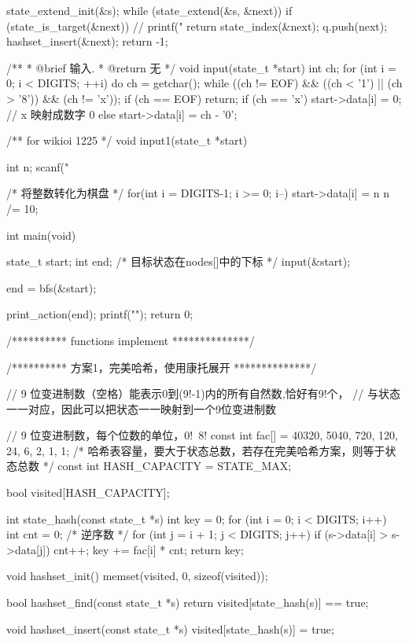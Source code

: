 \begin{Codex}[label=eight_digits_bfs.c]
{{        state_extend_init(&s);
        while (state_extend(&s, &next)) {
            if (state_is_target(&next)) {
                // printf("%
                return state_index(&next);
            }
            q.push(next);
            hashset_insert(&next);
        }
    }
    return -1;
}

/**
 * @brief 输入.
 * @return 无
 */
void input(state_t *start) {
    int ch;
    for (int i = 0; i < DIGITS; ++i) {
        do {
            ch = getchar();
        } while ((ch != EOF) && ((ch < '1') || (ch > '8')) && (ch != 'x'));
        if (ch == EOF) return;
        if (ch == 'x') start->data[i] = 0; // x 映射成数字 0
        else           start->data[i] = ch - '0';
    }
}

/** for wikioi 1225 */
void input1(state_t *start) {
    int n;
    scanf("%

    /* 将整数转化为棋盘 */
    for(int i = DIGITS-1; i >= 0; i--) {
        start->data[i] = n %
        n /= 10;
    }
}

int main(void) {
    state_t start;
    int end; /* 目标状态在nodes[]中的下标 */
    input(&start);

    end = bfs(&start);

    print_action(end);
    printf("\n");
    return 0;
}

/********** functions implement **************/

/********** 方案1，完美哈希，使用康托展开 **************/

// 9 位变进制数（空格）能表示0到(9!-1)内的所有自然数,恰好有9!个，
// 与状态一一对应，因此可以把状态一一映射到一个9位变进制数

// 9 位变进制数，每个位数的单位，0!~8!
const int fac[] = {40320, 5040, 720, 120, 24, 6, 2, 1, 1};
/* 哈希表容量，要大于状态总数，若存在完美哈希方案，则等于状态总数 */
const int HASH_CAPACITY = STATE_MAX;

bool visited[HASH_CAPACITY];

int state_hash(const state_t *s) {
    int key = 0;
    for (int i = 0; i < DIGITS; i++) {
        int cnt = 0;  /* 逆序数 */
        for (int j = i + 1; j < DIGITS; j++) if (s->data[i] > s->data[j]) cnt++;
        key += fac[i] * cnt;
    }
    return key;
}

void hashset_init() {
    memset(visited, 0, sizeof(visited));
}

bool hashset_find(const state_t *s) {
    return visited[state_hash(s)] == true;
}

void hashset_insert(const state_t *s) {
    visited[state_hash(s)] = true;
}


\end{Codex}
